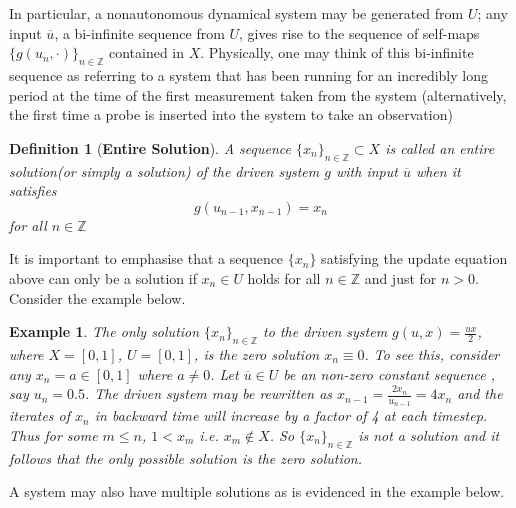\documentclass[a4paper,12pt,twoside]{book}
\newtheorem{Definition}{Definition}[]
\newtheorem{Example}{Example}[]
\begin{document}
In particular, a nonautonomous dynamical system may be generated from $U$; any input $\overline{u}$, a bi-infinite sequence from $U$, gives rise to the sequence of self-maps $\{g(u_n, \cdot)\}_{n\in\mathbb{Z}}$ contained in $X$.
Physically, one may think of this bi-infinite sequence as referring to a system that has been running for an incredibly long period at the time of the first measurement taken from the system (alternatively, the first time a probe is inserted into the system to take an observation)  

\begin{Definition}
  [\bf Entire Solution] \label{Dfn_Soln}
  A sequence $\{x_n\}_{n\in\mathbb{Z}}\subset X$  is called an entire solution(or simply a solution) of the driven system  $g$ with input $\overline{u}$ when it satisfies 
  \[g(u_{n-1}, x_{n-1})=x_n\] for all $n\in\mathbb{Z}$
\end{Definition}

It is important to emphasise that a sequence $\{x_n\}$ satisfying the update equation above can only be a solution if $x_n\in{U}$ holds for all $n\in\mathbb{Z}$ and just for $n>0$. Consider the example below.



\begin{Example} \rm \label{ex_halfux}
  The only solution  $\{x_n\}_{n\in\mathbb{Z}}$ to the driven system  $g(u,x)=\frac{ux}{2}$, where $X=[0,1]$, $U=[0,1]$,  is the zero solution $x_n\equiv0$.
  To see this, consider any $x_n=a\in[0,1]$ where $a\neq{0}$.  Let $\overline{u}\in{U}$ be an non-zero constant sequence , say $u_n=0.5$. 
  The driven system may be rewritten as $x_{n-1}=\frac{2x_n}{u_{n-1}}=4x_n$ and the  iterates of $x_n$ in backward time will increase by a factor of 4 at each timestep. 
  Thus for some $m\leq{n}$,  $1<x_m$ i.e. $x_m\notin{X}$. So ${\{x_n\}}_{n\in\mathbb{Z}}$ is not a solution and it follows that the only possible solution is the zero solution.
\end{Example}


A system may also have multiple solutions as is evidenced in the example below.
\end{document}
